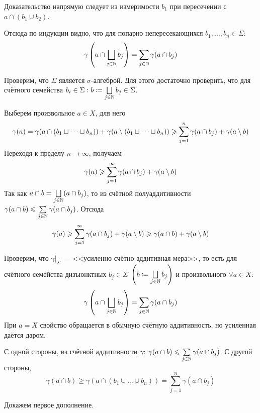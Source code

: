 \documentclass[a4paper]{report}
\begin{document}
{{            Доказательство напрямую следует из измеримости $b_1$ при пересечении с $a \cap (b_1 \cup b_2)$.

            Отсюда по индукции видно, что для попарно непересекающихся $b_1, \dots, b_n \in \Sigma$:
            \[\gamma\left( a \cap \bigsqcup\limits_{j \in \mathbb{N}}b_j\right) = \sum\limits_{j \in \mathbb{N}}\gamma(a \cap b_j)\]

            \item Проверим, что $\Sigma$ является $\sigma$-алгеброй.
            Для этого достаточно проверить, что для счётного семейства $b_i \in \Sigma: b \coloneqq \bigsqcup\limits_{j \in \mathbb{N}}b_j \in \Sigma$.


            Выберем произвольное $a \in X$, для него
            \[\gamma(a) = \gamma(a \cap (b_1 \sqcup \dots \sqcup b_n)) + \gamma(a \setminus (b_1 \sqcup \dots \sqcup b_n)) \geqslant \sum\limits_{j = 1}^{n}\gamma(a \cap b_j) + \gamma(a \setminus b)\]
            Переходя к пределу $n \to \infty$, получаем
            \[\gamma(a) \geqslant \sum\limits_{j = 1}^{\infty}\gamma(a \cap b_j) + \gamma(a \setminus b)\]
            Так как $a \cap b = \bigsqcup\limits_{j \in \mathbb{N}}(a \cap b_j)$, то из счётной полуаддитивности $\gamma(a \cap b) \leqslant \sum\limits_{j \in \mathbb{N}}\gamma(a \cap b_j)$.
            Отсюда
            \[\gamma(a) \geqslant \sum\limits_{j = 1}^{\infty}\gamma(a \cap b_j) + \gamma(a \setminus b) \geqslant \gamma(a \cap b) + \gamma(a \setminus b)\]
            \item Проверим, что $\gamma\big|_\Sigma$ --- <<усиленно счётно-аддитивная мера>>, то есть для счётного семейства дизъюнктных $b_j \in \Sigma$ $\left(b \coloneqq \bigsqcup\limits_{j \in \mathbb{N}}b_j\right)$ и произвольного $\forall a \in X$:
            \[\gamma\left( a\cap\bigsqcup\limits_{j \in \mathbb{N}}b_j\right) = \sum\limits_{j \in \mathbb{N}}\gamma(a \cap b_j)\]
            При $a = X$ свойство обращается в обычную счётную аддитивность, но усиленная даётся даром.

            С одной стороны, из счётной аддитивности $\gamma$: $\gamma(a \cap b) \leqslant \sum\limits_{j \in \mathbb{N}}\gamma(a \cap b_j)$.
            С другой стороны, \[\gamma( a\cap b) \ge \gamma(a \cap (b_1 \cup \dots \cup b_n)) = \sum\limits_{j = 1}^{n}\gamma(a \cap b_j)\]
            \item Докажем первое дополнение.

}}
\end{document}
